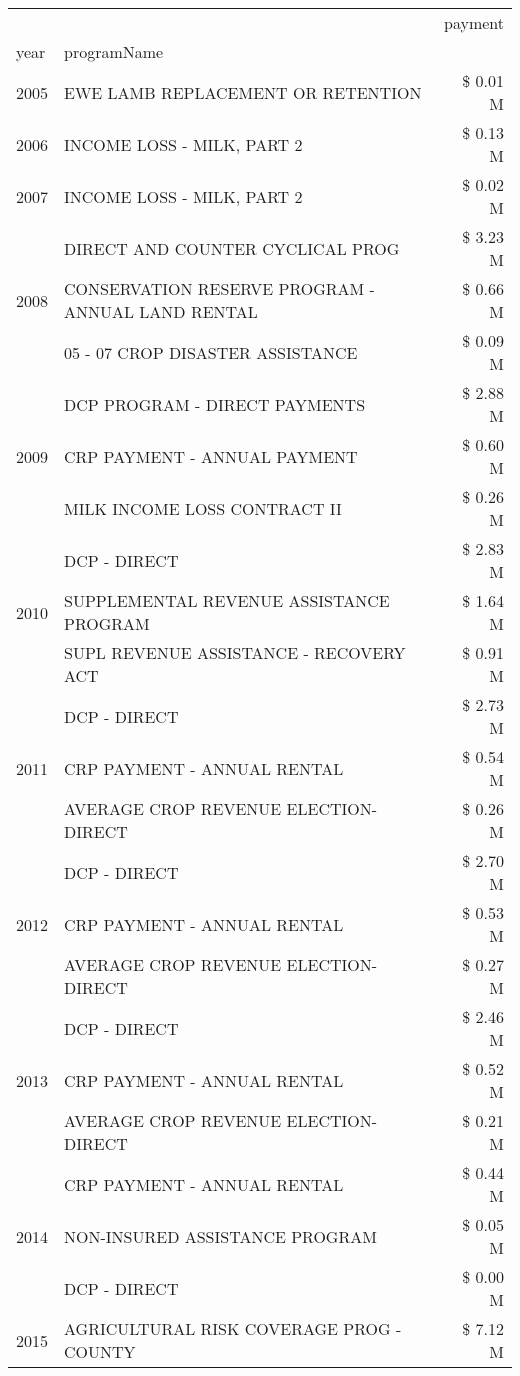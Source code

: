 \begin{tabular}{llr}
\toprule
 &  & payment \\
year & programName &  \\
\midrule
2005 & EWE LAMB REPLACEMENT OR RETENTION & \$ 0.01 M \\
\cline{1-3}
2006 & INCOME LOSS - MILK, PART 2 & \$ 0.13 M \\
\cline{1-3}
2007 & INCOME LOSS - MILK, PART 2 & \$ 0.02 M \\
\cline{1-3}
\multirow[t]{3}{*}{2008} & DIRECT AND COUNTER CYCLICAL PROG & \$ 3.23 M \\
 & CONSERVATION RESERVE PROGRAM - ANNUAL LAND RENTAL & \$ 0.66 M \\
 & 05 - 07 CROP DISASTER ASSISTANCE & \$ 0.09 M \\
\cline{1-3}
\multirow[t]{3}{*}{2009} & DCP PROGRAM - DIRECT PAYMENTS & \$ 2.88 M \\
 & CRP PAYMENT - ANNUAL PAYMENT & \$ 0.60 M \\
 & MILK INCOME LOSS CONTRACT II & \$ 0.26 M \\
\cline{1-3}
\multirow[t]{3}{*}{2010} & DCP - DIRECT & \$ 2.83 M \\
 & SUPPLEMENTAL REVENUE ASSISTANCE PROGRAM & \$ 1.64 M \\
 & SUPL REVENUE ASSISTANCE - RECOVERY ACT & \$ 0.91 M \\
\cline{1-3}
\multirow[t]{3}{*}{2011} & DCP - DIRECT & \$ 2.73 M \\
 & CRP PAYMENT - ANNUAL RENTAL & \$ 0.54 M \\
 & AVERAGE CROP REVENUE ELECTION-DIRECT & \$ 0.26 M \\
\cline{1-3}
\multirow[t]{3}{*}{2012} & DCP - DIRECT & \$ 2.70 M \\
 & CRP PAYMENT - ANNUAL RENTAL & \$ 0.53 M \\
 & AVERAGE CROP REVENUE ELECTION-DIRECT & \$ 0.27 M \\
\cline{1-3}
\multirow[t]{3}{*}{2013} & DCP - DIRECT & \$ 2.46 M \\
 & CRP PAYMENT - ANNUAL RENTAL & \$ 0.52 M \\
 & AVERAGE CROP REVENUE ELECTION-DIRECT & \$ 0.21 M \\
\cline{1-3}
\multirow[t]{3}{*}{2014} & CRP PAYMENT - ANNUAL RENTAL & \$ 0.44 M \\
 & NON-INSURED ASSISTANCE PROGRAM & \$ 0.05 M \\
 & DCP - DIRECT & \$ 0.00 M \\
\cline{1-3}
\multirow[t]{3}{*}{2015} & AGRICULTURAL RISK COVERAGE PROG - COUNTY & \$ 7.12 M \\

\end{tabular}
